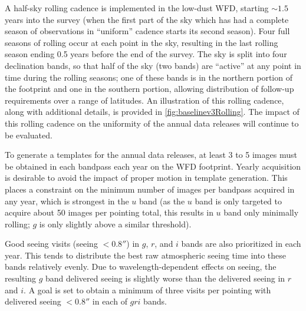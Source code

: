 \hangindent=0.7cm A half-sky rolling cadence is implemented in the low-dust WFD, starting $\sim1.5$ years into the survey (when the first part of the sky which has had a complete season of observations in ``uniform'' cadence starts its second season). Four full seasons of rolling occur at each point in the sky, resulting in the last rolling season ending 0.5 years before the end of the survey. The sky is split into four declination bands, so that half of the sky (two bands) are ``active'' at any point in time during the rolling seasons; one of these bands is in the northern portion of the footprint and one in the southern portion, allowing distribution of follow-up requirements over a range of latitudes. An illustration of this rolling cadence, along with additional details, is provided in \autoref{fig:baselinev3Rolling}. The impact of this rolling cadence on the uniformity of the annual data releases will continue to be evaluated. 

\hangindent=0.7cm To generate a templates for the annual data releases, at least 3 to 5 images must be obtained in each bandpass each year on the WFD footprint. Yearly acquisition is desirable to avoid the impact of proper motion in template generation. This places a constraint on the minimum number of images per bandpass  acquired in any year, which is strongest in the $u$ band (as the $u$ band is only targeted to acquire about 50 images per pointing total, this results in $u$ band only minimally rolling; $g$ is only slightly above a similar threshold). 

\hangindent=0.7cm Good seeing visits (seeing $<0.8''$) in $g$, $r$, and $i$ bands are also prioritized in each year. This tends to distribute the best raw atmospheric seeing time into these bands relatively evenly. Due to wavelength-dependent effects on seeing, the resulting $g$ band delivered seeing is slightly worse than the delivered seeing in $r$ and $i$. A goal is set to obtain a minimum of three visits per pointing with delivered seeing $<0.8''$ in each of $gri$ bands.

